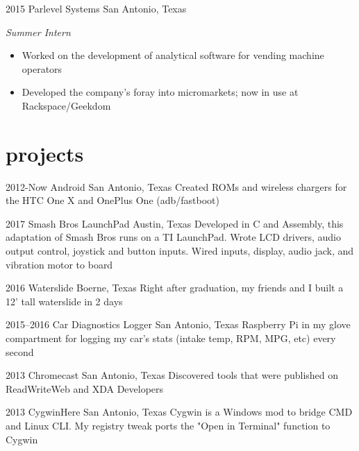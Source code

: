 \documentclass[]{friggeri-cv} %
\begin{document}
\begin{entrylist}

	\entry
	{2015}
	{Parlevel Systems}
	{San Antonio, Texas}
	{\emph{Summer Intern}
		\begin{itemize}
			\item Worked on the development of analytical software for vending machine operators
			\item Developed the company's foray into micromarkets; now in use at Rackspace/Geekdom
		\end{itemize}
	}

\end{entrylist}

\vspace{-7pt}


\section{projects}

\begin{entrylist}

	\entry
	{2012-Now}
	{Android}
	{San Antonio, Texas}
	{Created ROMs and wireless chargers for the HTC One X and OnePlus One (adb/fastboot)}


	\entry
	{2017}
	{Smash Bros LaunchPad}
	{Austin, Texas}
	{Developed in C and Assembly, this adaptation of Smash Bros runs on a TI LaunchPad. Wrote LCD drivers, audio output control, joystick and button inputs. Wired inputs, display, audio jack, and vibration motor to board}


	\entry
	{2016}
	{Waterslide}
	{Boerne, Texas}
	{Right after graduation, my friends and I built a 12' tall waterslide in 2 days}


	\entry
	{2015--2016}
	{Car Diagnostics Logger}
	{San Antonio, Texas}
	{Raspberry Pi in my glove compartment for logging my car's stats (intake temp, RPM, MPG, etc) every  second}


	\entry
	{2013}
	{Chromecast}
	{San Antonio, Texas}
	{Discovered tools that were published on ReadWriteWeb and XDA Developers}


	\entry
	{2013}
	{CygwinHere}
	{San Antonio, Texas}
	{Cygwin is a Windows mod to bridge CMD and Linux CLI. My registry tweak ports the "Open in Terminal" function to Cygwin}

\end{entrylist}
\end{document}
